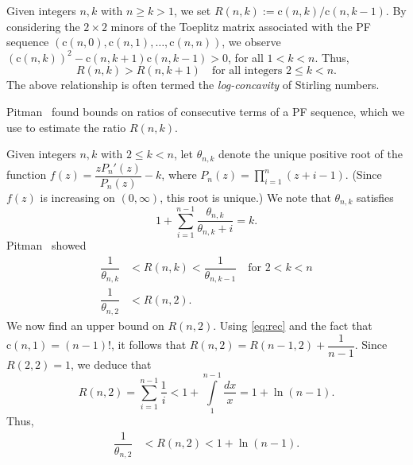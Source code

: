 \documentclass{amsart}
\newcommand{\st}{\mathrm{c}}
\begin{document}
Given integers $n,k$ with $n\geq k>1$, we set $R(n,k):=\st(n,k)/\st(n,k-1)$. By considering the $2\times 2$ minors of the Toeplitz matrix associated with the PF sequence $\left(\st(n,0), \st(n,1), \ldots, \st(n,n) \right)$, we observe $\left(\st(n,k)\right)^{2}-\st(n,k+1)\st(n,k-1)>0$, for all $1<k<n$. Thus, 
\begin{equation}\label{eq:log-concave}
 R(n,k) > R(n,k+1)\quad \text{for all integers $2\leq k<n$.}  
\end{equation}
The above relationship is often termed the {\it log-concavity} of Stirling numbers.

Pitman~\cite{Pitman} found bounds on ratios of consecutive terms of a PF sequence, which we use to estimate the ratio $R(n,k)$.

Given integers $n,k$ with $2\leq k<n$, let $\theta_{n,k}$ denote the unique positive root of the function $f(z)=\dfrac{zP_{n}'(z)}{P_{n}(z)}-k$, where $P_{n}(z)=\prod\limits_{i=1}^{n}(z+i-1)$. (Since $f(z)$ is increasing on $(0, \infty)$, this root is unique.) We note that $\theta_{n,k}$ satisfies
\begin{equation}\label{eq:saddle}
 1+\sum\limits_{i=1}^{n-1} \dfrac{\theta_{n,k}}{\theta_{n,k}+i} =k.   
\end{equation}
Pitman~\cite[Eq. $(34)$]{Pitman} showed 
\begin{subequations}\label{eq:pitman}
\begin{align}
    \dfrac{1}{\theta_{n,k}} &< R(n,k) < \dfrac{1}{\theta_{n,k-1}}\quad \text{for $2< k <n$}\\
    \dfrac{1}{\theta_{n,2}}&<R(n,2).
 \end{align}
\end{subequations}
We now find an upper bound on $R(n,2)$. Using \eqref{eq:rec} and the fact that $\st(n,1)=(n-1)!$, it follows that $R(n,2)=R(n-1,2)+\dfrac{1}{n-1}$. Since $R(2,2)=1$, we deduce that 
\[R(n,2)=\sum\limits_{i=1}^{n-1} \frac{1}{i} < 1+\int\limits_{1}^{n-1} \frac{dx}{x}=1+\ln(n-1).\] Thus, 
\begin{align}\label{eq:rn2}
\dfrac{1}{\theta_{n,2}}&<R(n,2)<1+\ln(n-1).
\end{align}
\end{document}
